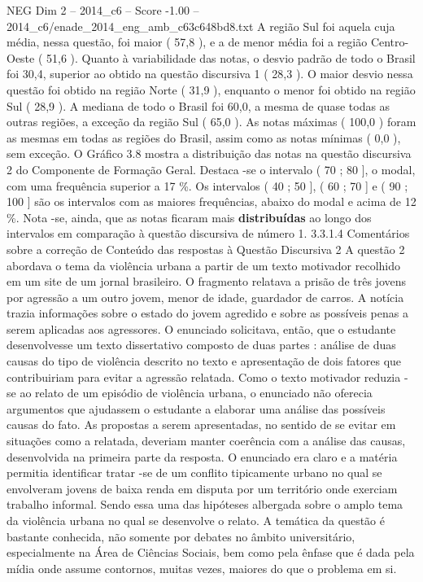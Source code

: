 \begin{textsample}{NEG Dim 2 – 2014\_c6 – Score -1.00 – 2014\_c6/enade\_2014\_eng\_amb\_c63c648bd8.txt}
A região Sul foi aquela cuja média, nessa questão, foi maior ( 57,8 ), e a de menor média foi a região Centro-Oeste ( 51,6 ).
Quanto à variabilidade das notas, o desvio padrão de todo o Brasil foi 30,4, superior ao obtido na questão discursiva 1 ( 28,3 ).
O maior desvio nessa questão foi obtido na região Norte ( 31,9 ), enquanto o menor foi obtido na região Sul ( 28,9 ).
A mediana de todo o Brasil foi 60,0, a mesma de quase todas as outras regiões, a exceção da região Sul ( 65,0 ).
As notas máximas ( 100,0 ) foram as mesmas em todas as regiões do Brasil, assim como as notas mínimas ( 0,0 ), sem exceção.
O Gráfico 3.8 mostra a distribuição das notas na questão discursiva 2 do Componente de Formação Geral.
Destaca -se o intervalo ( 70 ; 80 ], o modal, com uma frequência superior a 17 \%.
Os intervalos ( 40 ; 50 ], ( 60 ; 70 ] e ( 90 ; 100 ] são os intervalos com as maiores frequências, abaixo do modal e acima de 12 \%.
Nota -se, ainda, que as notas ficaram mais \textbf{distribuídas} ao longo dos intervalos em comparação à questão discursiva de número 1. 3.3.1.4 Comentários sobre a correção de Conteúdo das respostas à Questão Discursiva 2 A questão 2 abordava o tema da violência urbana a partir de um texto motivador recolhido em um site de um jornal brasileiro.
O fragmento relatava a prisão de três jovens por agressão a um outro jovem, menor de idade, guardador de carros.
A notícia trazia informações sobre o estado do jovem agredido e sobre as possíveis penas a serem aplicadas aos agressores.
O enunciado solicitava, então, que o estudante desenvolvesse um texto dissertativo composto de duas partes : análise de duas causas do tipo de violência descrito no texto e apresentação de dois fatores que contribuiriam para evitar a agressão relatada.
Como o texto motivador reduzia -se ao relato de um episódio de violência urbana, o enunciado não oferecia argumentos que ajudassem o estudante a elaborar uma análise das possíveis causas do fato.
As propostas a serem apresentadas, no sentido de se evitar em situações como a relatada, deveriam manter coerência com a análise das causas, desenvolvida na primeira parte da resposta.
O enunciado era claro e a matéria permitia identificar tratar -se de um conflito tipicamente urbano no qual se envolveram jovens de baixa renda em disputa por um território onde exerciam trabalho informal.
Sendo essa uma das hipóteses albergada sobre o amplo tema da violência urbana no qual se desenvolve o relato.
A temática da questão é bastante conhecida, não somente por debates no âmbito universitário, especialmente na Área de Ciências Sociais, bem como pela ênfase que é dada pela mídia onde assume contornos, muitas vezes, maiores do que o problema em si.

\end{textsample}
